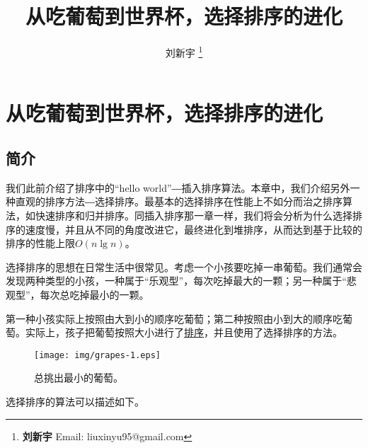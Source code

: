 \documentclass[UTF8]{article}
\begin{document}


\title{从吃葡萄到世界杯，选择排序的进化}

\author{刘新宇
\thanks{{\bfseries 刘新宇 } \newline
  Email: liuxinyu95@gmail.com \newline}
  }

\maketitle
\fi


\ifx\wholebook\relax
\chapter{从吃葡萄到世界杯，选择排序的进化}
\fi

\section{简介}
\label{introduction} 

我们此前介绍了排序中的“hello world”―插入排序算法。本章中，我们介绍另外一种直观的排序方法―选择排序。最基本的选择排序在性能上不如分而治之排序算法，如快速排序和归并排序。同插入排序那一章一样，我们将会分析为什么选择排序的速度慢，并且从不同的角度改进它，最终进化到堆排序，从而达到基于比较的排序的性能上限$O(n \lg n)$。

选择排序的思想在日常生活中很常见。考虑一个小孩要吃掉一串葡萄。我们通常会发现两种类型的小孩，一种属于“乐观型”，每次吃掉最大的一颗；另一种属于“悲观型”，每次总吃掉最小的一颗。

第一种小孩实际上按照由大到小的顺序吃葡萄；第二种按照由小到大的顺序吃葡萄。实际上，孩子把葡萄按照大小进行了\underline{排序}，并且使用了选择排序的方法。
\begin{figure}[htbp]
  \centering
  \texttt{[image: img/grapes-1.eps]}
  \caption{总挑出最小的葡萄。}
  \label{fig:eat-grapes}
\end{figure}

选择排序的算法可以描述如下。
\end{document}
